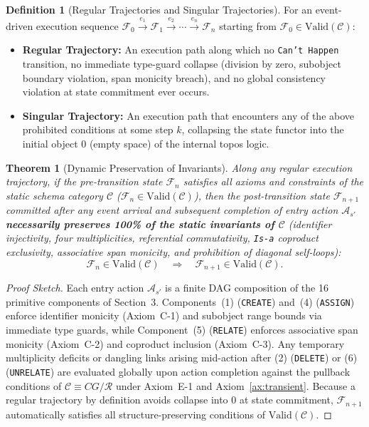 \documentclass[11pt,a4paper]{article}
\theoremstyle{definition}
\newtheorem{definition}{Definition}[section]
\theoremstyle{plain}
\newtheorem{theorem}{Theorem}[section]
\theoremstyle{remark}
\newcommand{\Valid}{\mathrm{Valid}}
\begin{document}
\begin{definition}[Regular Trajectories and Singular Trajectories]\label{def:trajectories}
For an event-driven execution sequence $\mathcal{F}_0 \xrightarrow{e_1} \mathcal{F}_1 \xrightarrow{e_2} \cdots \xrightarrow{e_n} \mathcal{F}_n$ starting from $\mathcal{F}_0 \in \Valid(\mathcal{C})$:
\begin{itemize}
    \item \textbf{Regular Trajectory:} An execution path along which no \texttt{Can't Happen} transition, no immediate type-guard collapse (division by zero, subobject boundary violation, span monicity breach), and no global consistency violation at state commitment ever occurs.
    \item \textbf{Singular Trajectory:} An execution path that encounters any of the above prohibited conditions at some step $k$, collapsing the state functor into the initial object $0$ (empty space) of the internal topos logic.
\end{itemize}
\end{definition}

\begin{theorem}[Dynamic Preservation of Invariants]\label{thm:inv-pres}
Along any regular execution trajectory, if the pre-transition state $\mathcal{F}_n$ satisfies all axioms and constraints of the static schema category $\mathcal{C}$ ($\mathcal{F}_n \in \Valid(\mathcal{C})$), then the post-transition state $\mathcal{F}_{n+1}$ committed after any event arrival and subsequent completion of entry action $\mathcal{A}_{s'}$ \textbf{necessarily preserves 100\% of the static invariants of $\mathcal{C}$} (identifier injectivity, four multiplicities, referential commutativity, \texttt{Is-a} coproduct exclusivity, associative span monicity, and prohibition of diagonal self-loops):
\begin{equation}
\mathcal{F}_n \in \Valid(\mathcal{C}) \quad \Longrightarrow \quad \mathcal{F}_{n+1} \in \Valid(\mathcal{C}).
\end{equation}
\end{theorem}

\begin{proof}[Proof Sketch]
Each entry action $\mathcal{A}_{s'}$ is a finite DAG composition of the 16 primitive components of Section~3. Components~(1) (\texttt{CREATE}) and~(4) (\texttt{ASSIGN}) enforce identifier monicity (Axiom~C-1) and subobject range bounds via immediate type guards, while Component~(5) (\texttt{RELATE}) enforces associative span monicity (Axiom~C-2) and coproduct inclusion (Axiom~C-3). Any temporary multiplicity deficits or dangling links arising mid-action after (2) (\texttt{DELETE}) or (6) (\texttt{UNRELATE}) are evaluated globally upon action completion against the pullback conditions of $\mathcal{C} \equiv CG/\mathcal{R}$ under Axiom~E-1 and Axiom~\ref{ax:transient}. Because a regular trajectory by definition avoids collapse into $0$ at state commitment, $\mathcal{F}_{n+1}$ automatically satisfies all structure-preserving conditions of $\Valid(\mathcal{C})$.
\end{proof}
\end{document}
